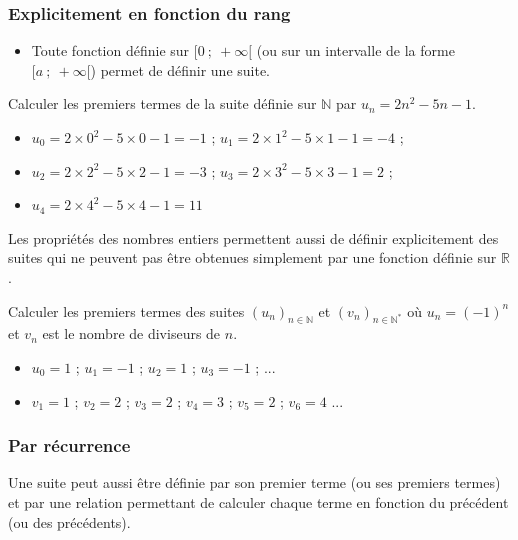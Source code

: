 \documentclass[french]{book}
\newcommand{\R}{\mathbb {R}}
\newcommand{\N}{\mathbb {N}}
\newcommand{\suite}[1][u]{\left( #1_{n} \right)_{n\in\N}}
\newcommand{\suitep}[1][u]{\left( #1_{n} \right)_{n\in\N^{*}}}
\begin{document}
\subsubsection*{Explicitement en fonction du rang}
\begin{itemize}


\item Toute fonction définie sur $[0~;~+\infty[$ (ou sur un intervalle de la forme $[a~;~+\infty[$) permet de définir une suite.
\end{itemize}
\begin{exemple}
Calculer les premiers termes de la suite définie sur $\N$ par $u_{n}=2n^2-5n-1$.
\begin{itemize}
\item $u_0=2\times0^2-5\times0-1=-1$ ; $u_1=2\times1^2-5\times1-1=-4$ ;
\item $u_2=2\times2^2-5\times2-1=-3$ ; $u_3=2\times3^2-5\times3-1=2$ ;
\item $u_4=2\times4^2-5\times4-1=11$
\end{itemize}
\end{exemple}

\begin{rem} 
Les propriétés des nombres entiers permettent aussi de définir explicitement des suites qui ne peuvent pas être obtenues simplement par une fonction définie sur $\R$.
\end{rem}
\begin{exemple}
Calculer les premiers termes des suites $\suite[u]$ et $\suitep[v]$ où $u_{n}=(-1)^{n}$ et $v_{n}$ est le nombre de diviseurs de $n$.

\begin{itemize}

\item $u_0=1$ ; $u_1=-1$ ; $u_2=1$ ; $u_3=-1$ ; ...
\vspace*{1.5ex}
\item $v_1=1$ ; $v_2=2$ ; $v_3=2$ ; $v_4=3$ ; $v_5=2$ ; $v_6=4$ ...
\end{itemize}
\end{exemple}

\subsubsection*{Par récurrence}
Une suite peut aussi être définie par son premier terme (ou ses premiers termes) et par une relation permettant de calculer chaque terme en fonction du précédent (ou des précédents).
\end{document}
